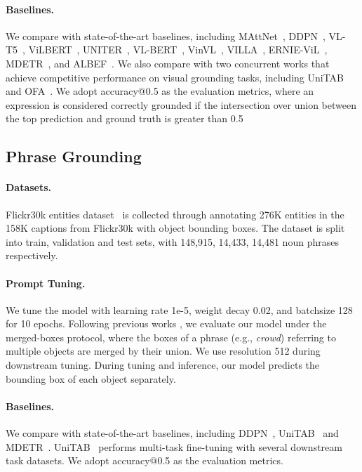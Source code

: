 \documentclass[11pt]{article}
\begin{document}
\paragraph{Baselines.} We compare with state-of-the-art baselines, including MAttNet~\cite{yu2018mattnet},    DDPN~\cite{yu2018rethinking},   VL-T5~\cite{DBLP:conf/icml/ChoLTB21},  ViLBERT~\cite{lu2019vilbert},  UNITER~\cite{chen2020uniter},   VL-BERT~\cite{su2019vl},  VinVL~\cite{zhang2021vinvl},  VILLA~\cite{DBLP:conf/nips/Gan0LZ0020},  ERNIE-ViL~\cite{yu2020ernie},  MDETR~\cite{kamath2021mdetr}, and  ALBEF~\cite{li2021align}. We also compare with two concurrent works that achieve competitive performance on visual grounding tasks, including UniTAB~\cite{yang2021crossing} and OFA~\cite{wang2022unifying}. We adopt accuracy@0.5 as the evaluation metrics, where an expression is considered correctly grounded if the intersection over union between the top prediction and ground truth is greater than 0.5

\subsection{Phrase Grounding}
\paragraph{Datasets.} Flickr30k entities dataset~\cite{plummer2015flickr30k} is collected through annotating 276K entities in the 158K captions from Flickr30k with object bounding boxes. The dataset is split into train, validation and test sets, with 148,915, 14,433, 14,481 noun phrases respectively.
\paragraph{Prompt Tuning. } We tune the model with learning rate 1e-5, weight decay 0.02, and batchsize 128 for 10 epochs. Following previous works \cite{kamath2021mdetr,yang2021crossing}, we evaluate our model under the merged-boxes protocol, where the boxes of a phrase (e.g., \textit{crowd}) referring to multiple objects are merged by their union. We use resolution 512 during downstream tuning. During tuning and inference, our model predicts the bounding box of each object separately.

\paragraph{Baselines. } We compare with state-of-the-art baselines, including DDPN~\cite{yu2018rethinking}, UniTAB~\cite{yang2021crossing} and MDETR~\cite{kamath2021mdetr}. UniTAB~\cite{yang2021crossing} performs multi-task fine-tuning with several downstream task datasets. We adopt accuracy@0.5 as the evaluation metrics.
\end{document}
